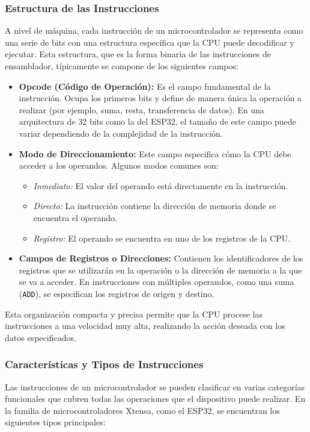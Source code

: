 \documentclass[a4paper,12pt]{article}
\begin{document}
	\subsubsection{Estructura de las Instrucciones}
	A nivel de máquina, cada instrucción de un microcontrolador se representa como una serie de bits con una estructura específica que la CPU puede decodificar y ejecutar. Esta estructura, que es la forma binaria de las instrucciones de ensamblador, típicamente se compone de los siguientes campos:
	
	\begin{itemize}
		\item \textbf{Opcode (Código de Operación):} Es el campo fundamental de la instrucción. Ocupa los primeros bits y define de manera única la operación a realizar (por ejemplo, suma, resta, transferencia de datos). En una arquitectura de 32 bits como la del ESP32, el tamaño de este campo puede variar dependiendo de la complejidad de la instrucción.
		\item \textbf{Modo de Direccionamiento:} Este campo especifica cómo la CPU debe acceder a los operandos. Algunos modos comunes son:
		\begin{itemize}
			\item \textit{Inmediato:} El valor del operando está directamente en la instrucción.
			\item \textit{Directo:} La instrucción contiene la dirección de memoria donde se encuentra el operando.
			\item \textit{Registro:} El operando se encuentra en uno de los registros de la CPU.
		\end{itemize}
		\item \textbf{Campos de Registros o Direcciones:} Contienen los identificadores de los registros que se utilizarán en la operación o la dirección de memoria a la que se va a acceder. En instrucciones con múltiples operandos, como una suma (\texttt{ADD}), se especifican los registros de origen y destino.
	\end{itemize}
	
	Esta organización compacta y precisa permite que la CPU procese las instrucciones a una velocidad muy alta, realizando la acción deseada con los datos especificados.
	
	\subsubsection{Características y Tipos de Instrucciones}
	Las instrucciones de un microcontrolador se pueden clasificar en varias categorías funcionales que cubren todas las operaciones que el dispositivo puede realizar. En la familia de microcontroladores Xtensa, como el ESP32, se encuentran los siguientes tipos principales:
	
\end{document}
